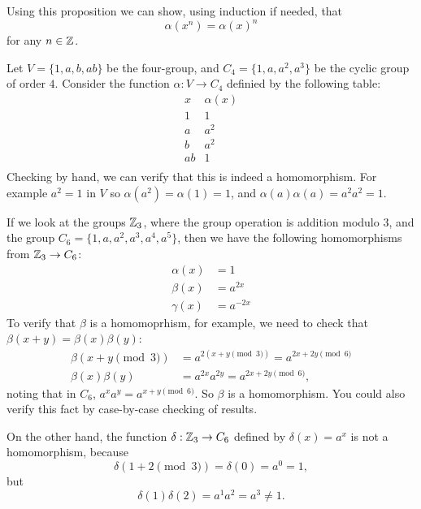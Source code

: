 Using this proposition we can show, using induction if needed, that
\[
  \alpha(x^{n}) = \alpha(x)^{n}
\]
for any $n \in \mathbb{Z}$.

\begin{example}\label{eg:4grouphom}
  Let $V = \{1, a, b, ab\}$ be the four-group, and $C_{4} = \{1, a,
  a^{2}, a^{3}\}$ be the cyclic group of order $4$.  Consider the
  function $\alpha: V \to C_{4}$ definied by the following table:
  \[
    \begin{array}{c|c}
      x & \alpha(x) \\
      \hline
      1 & 1 \\
      a & a^{2} \\
      b & a^{2} \\
      ab & 1 \\
    \end{array}
  \]
  Checking by hand, we can verify that this is indeed a 
  homomorphism.  For example $a^{2} = 1$ in $V$ so $\alpha(a^{2}) = 
  \alpha(1) = 1$, and $\alpha(a)\alpha(a) = a^{2}a^{2} = 1$.
\end{example}

\begin{example}
  If we look at the groups $\mathbb{Z}_{3}$, where the group operation
  is addition modulo $3$, and the group $C_{6} = \{1, a, a^{2}, a^{3},
  a^{4}, a^{5}\}$, then we have the following homomorphisms from
  $\mathbb{Z}_{3} \to C_{6}$:
  \begin{align*}
    \alpha(x) &= 1\\
    \beta(x) &= a^{2x}\\
    \gamma(x) &= a^{-2x}
  \end{align*}
  To verify that $\beta$ is a homomoprhism, for example, we need to
  check that $\beta(x+y) = \beta(x)\beta(y)$:
  \begin{align*}
    \beta(x+y \pmod{3}) &= a^{2(x+y \pmod{3})} = a^{2x+2y \pmod{6}}\\
    \beta(x)\beta(y) &= a^{2x}a^{2y} = a^{2x+2y \pmod{6}},
  \end{align*}
  noting that in $C_{6}$, $a^{x}a^{y} = a^{x+y \pmod{6}}$.
  So $\beta$ is a homomorphism.  You could also verify this fact by 
  case-by-case checking of results.
  
  On the other hand, the function $\delta: \mathbb{Z}_{3} \to C_{6}$ 
  defined by $\delta(x) = a^{x}$ is not a homomorphism, because
  \[
    \delta(1 + 2 \pmod{3}) = \delta(0) = a^{0} = 1,
  \]
  but
  \[
    \delta(1)\delta(2) = a^{1}a^{2} = a^{3} \ne 1.
  \]
\end{example}

